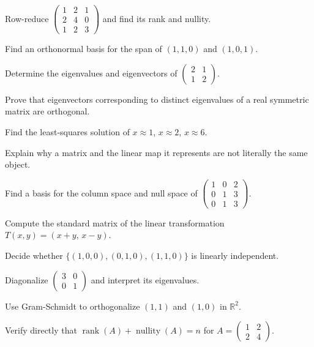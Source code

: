 \begin{chapterexercises}
    \item Row-reduce $\begin{pmatrix}1&2&1\\2&4&0\\1&2&3\end{pmatrix}$ and find its rank and nullity.
    \item Find an orthonormal basis for the span of $(1,1,0)$ and $(1,0,1)$.
    \item Determine the eigenvalues and eigenvectors of $\begin{pmatrix}2&1\\1&2\end{pmatrix}$.
    \item Prove that eigenvectors corresponding to distinct eigenvalues of a real symmetric matrix are orthogonal.
    \item Find the least-squares solution of $x\approx1$, $x\approx2$, $x\approx6$.
    \item Explain why a matrix and the linear map it represents are not literally the same object.
    \item Find a basis for the column space and null space of $\begin{pmatrix}1&0&2\\0&1&3\\0&1&3\end{pmatrix}$.
    \item Compute the standard matrix of the linear transformation $T(x,y)=(x+y,\,x-y)$.
    \item Decide whether $\{(1,0,0),(0,1,0),(1,1,0)\}$ is linearly independent.
    \item Diagonalize $\begin{pmatrix}3&0\\0&1\end{pmatrix}$ and interpret its eigenvalues.
    \item Use Gram-Schmidt to orthogonalize $(1,1)$ and $(1,0)$ in $\mathbb{R}^2$.
    \item Verify directly that $\operatorname{rank}(A)+\operatorname{nullity}(A)=n$ for $A=\begin{pmatrix}1&2\\2&4\end{pmatrix}$.
\end{chapterexercises}

